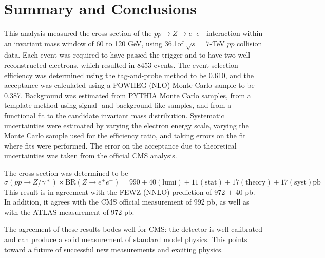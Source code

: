 \chapter{Summary and Conclusions}
\label{summ}

This analysis measured the cross section of the 
$pp \rightarrow Z \rightarrow e^+ e^-$ 
interaction within an invariant mass window of 60 to 120 GeV, 
using 36.1\pb of $\sqrt{s} = 7$-TeV $pp$ collision data.  
Each event was required to have passed the trigger 
and to have two well-reconstructed electrons, 
which resulted in 8453 events.  
The event selection efficiency was determined using the 
tag-and-probe method to be 0.610, 
and the acceptance was calculated using a 
POWHEG (NLO) Monte Carlo \Zee sample to be 0.387.  
Background was estimated from PYTHIA Monte Carlo samples, 
from a template method using signal- and background-like 
samples, 
and from a functional fit to the 
candidate invariant mass distribution.  
Systematic uncertainties were estimated 
by varying the electron energy scale, 
varying the Monte Carlo sample used for the efficiency ratio, 
and taking errors on the fit where fits were performed.  
The error on the acceptance due to theoretical uncertainties 
was taken from the official CMS analysis.  

The cross section was determined to be 
\[
\sigma(pp \rightarrow Z/\gamma *) \times \mathrm{BR}(Z \rightarrow e^+ e^- )
= 990 \pm 40 \mathrm{(lumi)} \pm 11 \mathrm{(stat)} \pm 17 \mathrm{(theory)} \pm 17 \mathrm{(syst)} \mathrm{pb}
\]
This result is in agreement with the FEWZ (NNLO) 
prediction of 972 $\pm$ 40 pb.  
In addition, it agrees with the CMS official measurement of 992 pb, 
as well as with the ATLAS measurement of 972 pb.  

The agreement of these results bodes well for CMS: 
the detector is well calibrated and can produce 
a solid measurement of standard model physics.  
This points toward a future of successful new 
measurements and exciting physics.  

